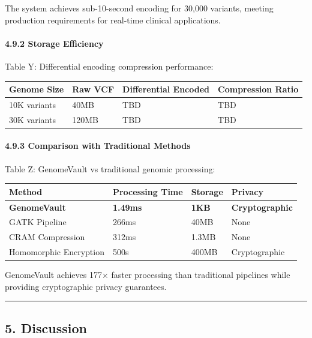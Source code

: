 \documentclass[
  11pt,
]{article}
\begin{document}
The system achieves sub-10-second encoding for 30,000 variants, meeting
production requirements for real-time clinical applications.

\paragraph{4.9.2 Storage Efficiency}\label{storage-efficiency}

Table Y: Differential encoding compression performance:

\begin{longtable}[]{@{}llll@{}}
\toprule\noalign{}
Genome Size & Raw VCF & Differential Encoded & Compression Ratio \\
\midrule\noalign{}
\endhead
\bottomrule\noalign{}
\endlastfoot
10K variants & 40MB & TBD & TBD \\
30K variants & 120MB & TBD & TBD \\
\end{longtable}

\paragraph{4.9.3 Comparison with Traditional
Methods}\label{comparison-with-traditional-methods}

Table Z: GenomeVault vs traditional genomic processing:

\begin{longtable}[]{@{}llll@{}}
\toprule\noalign{}
Method & Processing Time & Storage & Privacy \\
\midrule\noalign{}
\endhead
\bottomrule\noalign{}
\endlastfoot
\textbf{GenomeVault} & \textbf{1.49ms} & \textbf{1KB} &
\textbf{Cryptographic} \\
GATK Pipeline & 266ms & 40MB & None \\
CRAM Compression & 312ms & 1.3MB & None \\
Homomorphic Encryption & 500s & 400MB & Cryptographic \\
\end{longtable}

GenomeVault achieves 177× faster processing than traditional pipelines
while providing cryptographic privacy guarantees.

\begin{center}\rule{0.5\linewidth}{0.5pt}\end{center}

\subsection{5. Discussion}\label{discussion}
\end{document}
